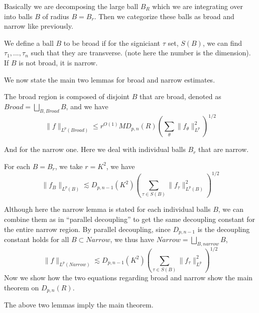 Basically we are decomposing the large ball $B_R$ which we are integrating over into balls $B$ of radius $B=B_r$. Then we categorize these balls as broad and narrow like previously.
\begin{definition}
    We define a ball $B$ to be broad if for the signiciant $\tau$ set, $S(B)$, we can find $\tau_1, ..., \tau_n$ such that they are transverse. (note here the number is the dimension). If $B$ is not broad, it is narrow.
\end{definition}
We now state the main two lemmas for broad and narrow estimates.
\begin{lemma}[Broad]
    The broad region is composed of disjoint $B$ that are broad, denoted as $Broad=\bigsqcup_{B, Broad}B$, and we have
    \begin{equation*}
        \|f\|_{L^p(Broad)}\leq r^{O(1)}MD_{p,n}(R)\left(\sum_{\theta}\|f_\theta\|_{L^p}^2 \right)^{1/2}
    \end{equation*}
\end{lemma}
And for the narrow one. Here we deal with individual balls $B_r$ that are narrow.
\begin{lemma}[Narrow]
    For each $B=B_r$, we take $r=K^2$, we have
    \begin{equation*}
        \|f_B\|_{L^p(B)}\lesssim D_{p,n-1}(K^2)\left(\sum_{\tau\in S(B)}\|f_\tau\|_{L^p(B)}^2 \right)^{1/2}
    \end{equation*}
\end{lemma}
Although here the narrow lemma is stated for each individual balls $B$, we can combine them as in ``parallel decoupling'' to get the same decoupling constant for the entire narrow region. By parallel decoupling, since $D_{p,n-1}$ is the decoupling constant holds for all $B\subset Narrow$, we thus have $Narrow=\bigsqcup_{B,narrow}B$,
\begin{equation*}
    \|f\|_{L^p(Narrow)}\lesssim D_{p,n-1}(K^2)\left(\sum_{\tau\in S(B)}\|f_\tau\|_{L^p}^2 \right)^{1/2}
\end{equation*}
Now we show how the two equations regarding broad and narrow show the main theorem on $D_{p,n}(R)$.
\begin{proposition}
    The above two lemmas imply the main theorem.
\end{proposition}
